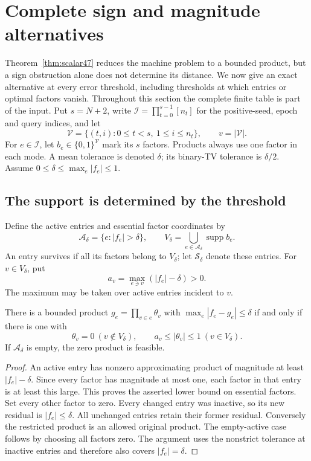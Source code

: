 \section{Complete sign and magnitude alternatives}\label{sec:duality49}
Theorem~\ref{thm:scalar47} reduces the machine problem to a bounded
product, but a sign obstruction alone does not determine its distance.
We now give an exact alternative at every error threshold, including
thresholds at which entries or optimal factors vanish. Throughout this
section the complete finite table is part of the input. Put $s=N+2$,
write $\mathcal I=\prod_{t=0}^{s-1}[n_t]$ for the positive-seed, epoch
and query indices, and let
\[
 \mathcal V=\{(t,i):0\le t<s,\ 1\le i\le n_t\},\qquad
 v=|\mathcal V|.
\]
For $e\in\mathcal I$, let $b_e\in\{0,1\}^{\mathcal V}$ mark its
$s$ factors. Products always use one factor in each mode.
A mean tolerance is denoted $\delta$; its binary-TV tolerance is
$\delta/2$. Assume $0\le\delta\le\max_e|f_e|\le1$.

\subsection{The support is determined by the threshold}
Define the active entries and essential factor coordinates by
\begin{equation}\label{eq:active49}
 \mathcal A_\delta=\{e:|f_e|>\delta\},\qquad
 V_\delta=\bigcup_{e\in\mathcal A_\delta}\operatorname{supp}b_e.
\end{equation}
An entry survives if all its factors belong to $V_\delta$; let
$\mathcal S_\delta$ denote these entries. For $v\in V_\delta$, put
\[
 a_v=\max_{e\ni v}(|f_e|-\delta)>0.
\]
The maximum may be taken over active entries incident to $v$.

\begin{lemma}\label{lem:support49}
There is a bounded product $g_e=\prod_{v\in e}\theta_v$ with
$\max_e|f_e-g_e|\le\delta$ if and only if there is one with
\[
 \theta_v=0\ (v\notin V_\delta),\qquad
 a_v\le|\theta_v|\le1\ (v\in V_\delta).
\]
If $\mathcal A_\delta$ is empty, the zero product is feasible.
\end{lemma}
\begin{proof}
An active entry has nonzero approximating product of magnitude at least
$|f_e|-\delta$. Since every factor has magnitude at most one, each
factor in that entry is at least this large. This proves the asserted
lower bound on essential factors. Set every other factor to zero.
Every changed entry was inactive, so its new residual is $|f_e|\le\delta$.
All unchanged entries retain their former residual. Conversely the
restricted product is an allowed original product. The empty-active
case follows by choosing all factors zero. The argument uses the
nonstrict tolerance at inactive entries and therefore also covers
$|f_e|=\delta$.
\end{proof}

